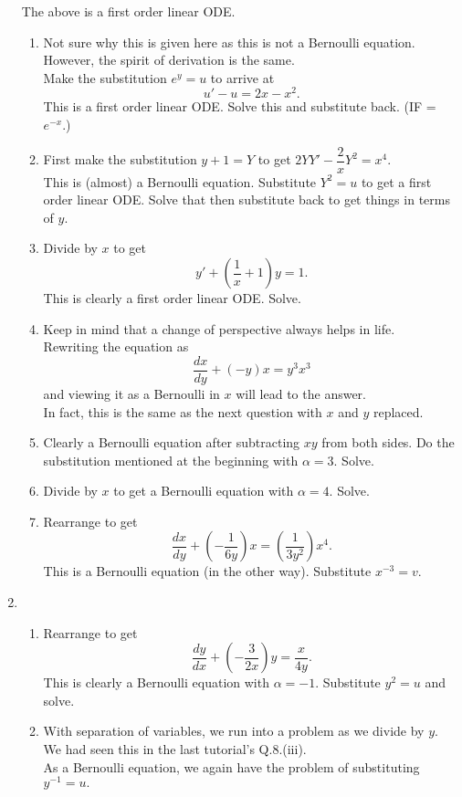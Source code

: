 \documentclass{article}
\begin{document}
\begin{enumerate}[label = Q.\arabic*.]
	The above is a first order linear ODE.
	\begin{enumerate}[label = (\roman*)] 
		\item Not sure why this is given here as this is not a Bernoulli equation. However, the spirit of derivation is the same.\\
		Make the substitution $e^y = u$ to arrive at
		\[u' - u = 2x - x^2.\]
		This is a first order linear ODE. Solve this and substitute back. (IF = $e^{-x}.$)
		\item First make the substitution $y + 1 = Y$ to get $2YY' - \dfrac{2}{x}Y^2 = x^4.$\\
		This is (almost) a Bernoulli equation. Substitute $Y^2 = u$ to get a first order linear ODE. Solve that then substitute back to get things in terms of $y.$
		\item Divide by $x$ to get
		\[y' + \left(\dfrac{1}{x} + 1\right)y = 1.\]
		This is clearly a first order linear ODE. Solve.
		\item Keep in mind that a change of perspective always helps in life.\\
		Rewriting the equation as
		\[\frac{dx}{dy} + (-y)x = y^3x^3\]
		and viewing it as a Bernoulli in $x$ will lead to the answer.\\
		In fact, this is the same as the next question with $x$ and $y$ replaced.
		\item Clearly a Bernoulli equation after subtracting $xy$ from both sides. Do the substitution mentioned at the beginning with $\alpha = 3.$ Solve.
		\item Divide by $x$ to get a Bernoulli equation with $\alpha = 4.$ Solve.
		\item Rearrange to get
		\[\frac{dx}{dy} + \left(-\frac{1}{6y}\right)x = \left(\frac{1}{3y^2}\right)x^4.\]
		This is a Bernoulli equation (in the other way). Substitute $x^{-3} = v.$
	\end{enumerate}
	\item 
	\begin{enumerate}[label = (\roman*)] 
		\item Rearrange to get
		\[\dfrac{dy}{dx} + \left(-\frac{3}{2x}\right)y = \frac{x}{4y}.\]
		This is clearly a Bernoulli equation with $\alpha = -1.$ Substitute $y^2 = u$ and solve.
		\item With separation of variables, we run into a problem as we divide by $y.$ We had seen this in the last tutorial's Q.8.(iii).\\
		As a Bernoulli equation, we again have the problem of substituting $y^{-1} = u.$\\

\end{enumerate}
\end{enumerate}
\end{document}
